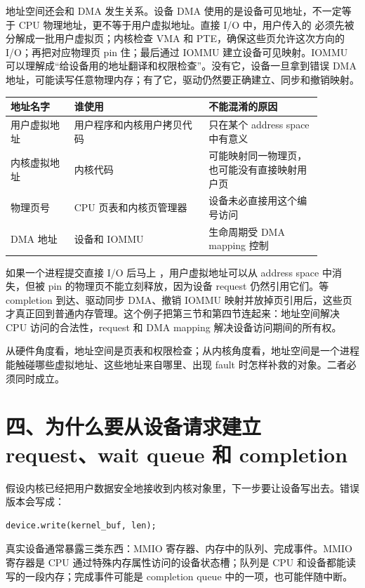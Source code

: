 地址空间还会和 DMA 发生关系。设备 DMA 使用的是设备可见地址，不一定等于 CPU 物理地址，更不等于用户虚拟地址。直接 I/O 中，用户传入的  必须先被分解成一批用户虚拟页；内核检查 VMA 和 PTE，确保这些页允许这次方向的 I/O；再把对应物理页 pin 住；最后通过 IOMMU 建立设备可见映射。IOMMU 可以理解成“给设备用的地址翻译和权限检查”。没有它，设备一旦拿到错误 DMA 地址，可能读写任意物理内存；有了它，驱动仍然要正确建立、同步和撤销映射。

\begin{longtable}{p{0.18\linewidth}p{0.38\linewidth}p{0.32\linewidth}}
\toprule
地址名字 & 谁使用 & 不能混淆的原因 \\
\midrule
用户虚拟地址 & 用户程序和内核用户拷贝代码 & 只在某个 address space 中有意义 \\
内核虚拟地址 & 内核代码 & 可能映射同一物理页，也可能没有直接映射用户页 \\
物理页号 & CPU 页表和内核页管理器 & 设备未必直接用这个编号访问 \\
DMA 地址 & 设备和 IOMMU & 生命周期受 DMA mapping 控制 \\
\bottomrule
\end{longtable}

如果一个进程提交直接 I/O 后马上 ，用户虚拟地址可以从 address space 中消失，但被 pin 的物理页不能立刻释放，因为设备 request 仍然引用它们。等 completion 到达、驱动同步 DMA、撤销 IOMMU 映射并放掉页引用后，这些页才真正回到普通内存管理。这个例子把第三节和第四节连起来：地址空间解决 CPU 访问的合法性，request 和 DMA mapping 解决设备访问期间的所有权。

从硬件角度看，地址空间是页表和权限检查；从内核角度看，地址空间是一个进程能触碰哪些虚拟地址、这些地址来自哪里、出现 fault 时怎样补救的对象。二者必须同时成立。

\section{四、为什么要从设备请求建立 request、wait queue 和 completion}

假设内核已经把用户数据安全地接收到内核对象里，下一步要让设备写出去。错误版本会写成：

\begin{lstlisting}
device.write(kernel_buf, len);
\end{lstlisting}

真实设备通常暴露三类东西：MMIO 寄存器、内存中的队列、完成事件。MMIO 寄存器是 CPU 通过特殊内存属性访问的设备状态槽；队列是 CPU 和设备都能读写的一段内存；完成事件可能是 completion queue 中的一项，也可能伴随中断。

